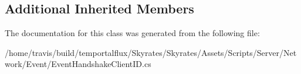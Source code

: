 \subsection*{Additional Inherited Members}


The documentation for this class was generated from the following file\-:\begin{DoxyCompactItemize}
\item 
/home/travis/build/temportalflux/\-Skyrates/\-Skyrates/\-Assets/\-Scripts/\-Server/\-Network/\-Event/Event\-Handshake\-Client\-I\-D.\-cs\end{DoxyCompactItemize}
